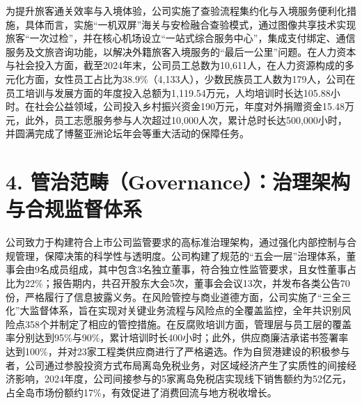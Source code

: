 \documentclass[a4paper,12pt]{article}
\begin{document}
为提升旅客通关效率与入境体验，公司实施了查验流程集约化与入境服务便利化措施，具体而言，实施“一机双屏”海关与安检融合查验模式，通过图像共享技术实现旅客“一次过检”，并在核心机场设立“一站式综合服务中心”，集成支付绑定、通信服务及文旅咨询功能，以解决外籍旅客入境服务的“最后一公里”问题。在人力资本与社会投入方面，截至2024年末，公司员工总数为10,611人，在人力资源构成的多元化方面，女性员工占比为38.9\%（4,133人），少数民族员工人数为179人，公司在员工培训与发展方面的年度投入总额为1,119.54万元，人均培训时长达105.88小时。在社会公益领域，公司投入乡村振兴资金190万元，年度对外捐赠资金15.48万元，此外，员工志愿服务参与人次超过10,000人次，累计总时长达500,000小时，并圆满完成了博鳌亚洲论坛年会等重大活动的保障任务。

\section{4. 管治范畴（Governance）：治理架构与合规监督体系}

公司致力于构建符合上市公司监管要求的高标准治理架构，通过强化内部控制与合规管理，保障决策的科学性与透明度。公司构建了规范的“五会一层”治理体系，董事会由9名成员组成，其中包含3名独立董事，符合独立性监管要求，且女性董事占比为22\%；报告期内，共召开股东大会5次，董事会会议13次，并发布各类公告70份，严格履行了信息披露义务。在风险管控与商业道德方面，公司实施了“三全三化”大监督体系，旨在实现对关键业务流程与风险点的全覆盖监控，全年共识别风险点358个并制定了相应的管控措施。在反腐败培训方面，管理层与员工层的覆盖率分别达到95\%与90\%，累计培训时长400小时；此外，供应商廉洁承诺书签署率达到100\%，并对23家工程类供应商进行了严格遴选。作为自贸港建设的积极参与者，公司通过参股投资方式布局离岛免税业务，对区域经济产生了实质性的间接经济影响，2024年度，公司间接参与的5家离岛免税店实现线下销售额约为52亿元，占全岛市场份额约17\%，有效促进了消费回流与地方税收增长。
\end{document}
